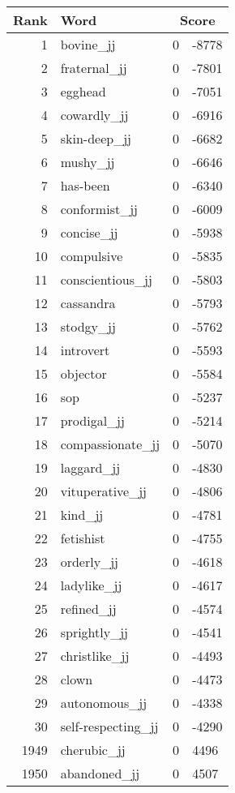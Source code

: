 \begin{longtable}[!htbp]{| rlr@{.}l |}
    \hline
    \textbf{Rank} & \textbf{Word} & \multicolumn{2}{c|}{\textbf{Score}} \\
    \hline
    \endhead
    1 & bovine\_jj & 0 & -8778 \\
    2 & fraternal\_jj & 0 & -7801 \\
    3 & egghead & 0 & -7051 \\
    4 & cowardly\_jj & 0 & -6916 \\
    5 & skin-deep\_jj & 0 & -6682 \\
    6 & mushy\_jj & 0 & -6646 \\
    7 & has-been & 0 & -6340 \\
    8 & conformist\_jj & 0 & -6009 \\
    9 & concise\_jj & 0 & -5938 \\
    10 & compulsive & 0 & -5835 \\
    11 & conscientious\_jj & 0 & -5803 \\
    12 & cassandra & 0 & -5793 \\
    13 & stodgy\_jj & 0 & -5762 \\
    14 & introvert & 0 & -5593 \\
    15 & objector & 0 & -5584 \\
    16 & sop & 0 & -5237 \\
    17 & prodigal\_jj & 0 & -5214 \\
    18 & compassionate\_jj & 0 & -5070 \\
    19 & laggard\_jj & 0 & -4830 \\
    20 & vituperative\_jj & 0 & -4806 \\
    21 & kind\_jj & 0 & -4781 \\
    22 & fetishist & 0 & -4755 \\
    23 & orderly\_jj & 0 & -4618 \\
    24 & ladylike\_jj & 0 & -4617 \\
    25 & refined\_jj & 0 & -4574 \\
    26 & sprightly\_jj & 0 & -4541 \\
    27 & christlike\_jj & 0 & -4493 \\
    28 & clown & 0 & -4473 \\
    29 & autonomous\_jj & 0 & -4338 \\
    30 & self-respecting\_jj & 0 & -4290 \\
    1949 & cherubic\_jj & 0 & 4496 \\
    1950 & abandoned\_jj & 0 & 4507 \\

\end{longtable}
